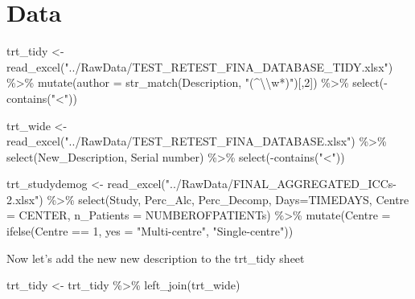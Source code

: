 \documentclass[
]{article}
\newenvironment{Shaded}{\begin{snugshade}}{\end{snugshade}}
\newcommand{\AttributeTok}[1]{\textcolor[rgb]{0.77,0.63,0.00}{#1}}
\newcommand{\DecValTok}[1]{\textcolor[rgb]{0.00,0.00,0.81}{#1}}
\newcommand{\FunctionTok}[1]{\textcolor[rgb]{0.00,0.00,0.00}{#1}}
\newcommand{\NormalTok}[1]{#1}
\newcommand{\OtherTok}[1]{\textcolor[rgb]{0.56,0.35,0.01}{#1}}
\newcommand{\SpecialCharTok}[1]{\textcolor[rgb]{0.00,0.00,0.00}{#1}}
\newcommand{\StringTok}[1]{\textcolor[rgb]{0.31,0.60,0.02}{#1}}
\begin{document}
\hypertarget{data}{%
\section{Data}\label{data}}

\begin{Shaded}
\begin{Highlighting}[]
\NormalTok{trt\_tidy }\OtherTok{\textless{}{-}} \FunctionTok{read\_excel}\NormalTok{(}\StringTok{"../RawData/TEST\_RETEST\_FINA\_DATABASE\_TIDY.xlsx"}\NormalTok{) }\SpecialCharTok{\%\textgreater{}\%} 
  \FunctionTok{mutate}\NormalTok{(}\AttributeTok{author =} \FunctionTok{str\_match}\NormalTok{(Description, }\StringTok{"(\^{}}\SpecialCharTok{\textbackslash{}\textbackslash{}}\StringTok{w*)"}\NormalTok{)[,}\DecValTok{2}\NormalTok{]) }\SpecialCharTok{\%\textgreater{}\%} 
  \FunctionTok{select}\NormalTok{(}\SpecialCharTok{{-}}\FunctionTok{contains}\NormalTok{(}\StringTok{"<"}\NormalTok{))}

\NormalTok{trt\_wide }\OtherTok{\textless{}{-}} \FunctionTok{read\_excel}\NormalTok{(}\StringTok{"../RawData/TEST\_RETEST\_FINA\_DATABASE.xlsx"}\NormalTok{) }\SpecialCharTok{\%\textgreater{}\%} 
  \FunctionTok{select}\NormalTok{(New\_Description, }\StringTok{\textasciigrave{}}\AttributeTok{Serial number}\StringTok{\textasciigrave{}}\NormalTok{) }\SpecialCharTok{\%\textgreater{}\%} 
  \FunctionTok{select}\NormalTok{(}\SpecialCharTok{{-}}\FunctionTok{contains}\NormalTok{(}\StringTok{"<"}\NormalTok{))}

\NormalTok{trt\_studydemog }\OtherTok{\textless{}{-}} \FunctionTok{read\_excel}\NormalTok{(}\StringTok{"../RawData/FINAL\_AGGREGATED\_ICCs{-}2.xlsx"}\NormalTok{) }\SpecialCharTok{\%\textgreater{}\%} 
  \FunctionTok{select}\NormalTok{(Study, Perc\_Alc, Perc\_Decomp, }\AttributeTok{Days=}\NormalTok{TIMEDAYS, }
         \AttributeTok{Centre =}\NormalTok{ CENTER,}
         \AttributeTok{n\_Patients =}\NormalTok{ NUMBEROFPATIENTs) }\SpecialCharTok{\%\textgreater{}\%} 
  \FunctionTok{mutate}\NormalTok{(}\AttributeTok{Centre =} \FunctionTok{ifelse}\NormalTok{(Centre }\SpecialCharTok{==} \DecValTok{1}\NormalTok{, }\AttributeTok{yes =} \StringTok{"Multi{-}centre"}\NormalTok{, }\StringTok{"Single{-}centre"}\NormalTok{))}
\end{Highlighting}
\end{Shaded}

Now let's add the new new description to the trt\_tidy sheet

\begin{Shaded}
\begin{Highlighting}[]
\NormalTok{trt\_tidy }\OtherTok{\textless{}{-}}\NormalTok{ trt\_tidy }\SpecialCharTok{\%\textgreater{}\%} 
  \FunctionTok{left\_join}\NormalTok{(trt\_wide)}
\end{Highlighting}
\end{Shaded}
\end{document}

